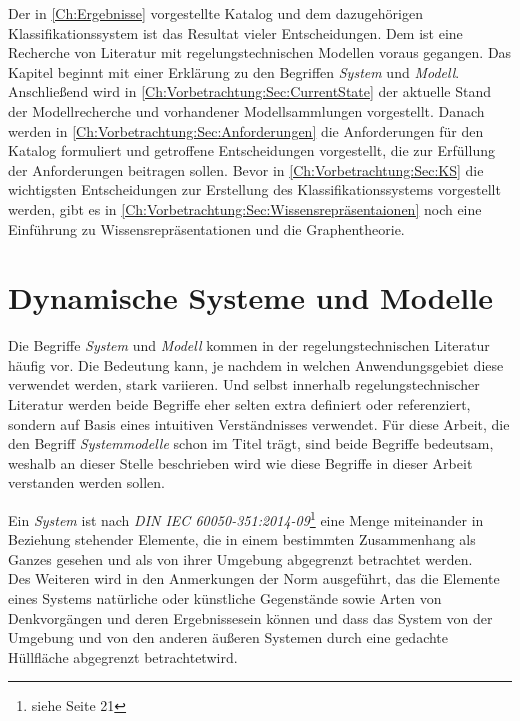 Der in \ref{Ch:Ergebnisse} vorgestellte Katalog und dem dazugehörigen Klassifikationssystem ist das Resultat vieler Entscheidungen. Dem ist eine Recherche von Literatur mit regelungstechnischen Modellen voraus gegangen. Das Kapitel beginnt mit einer Erklärung zu den Begriffen \textit{System} und \textit{Modell}. Anschließend wird in \ref{Ch:Vorbetrachtung:Sec:CurrentState} der aktuelle Stand der Modellrecherche und vorhandener Modellsammlungen vorgestellt. Danach werden in \ref{Ch:Vorbetrachtung:Sec:Anforderungen} die Anforderungen für den Katalog formuliert und getroffene Entscheidungen vorgestellt, die zur Erfüllung der Anforderungen beitragen sollen. Bevor in \ref{Ch:Vorbetrachtung:Sec:KS} die wichtigsten Entscheidungen zur Erstellung des Klassifikationssystems vorgestellt werden, gibt es in \ref{Ch:Vorbetrachtung:Sec:Wissensrepräsentaionen} noch eine Einführung zu Wissensrepräsentationen und die Graphentheorie.   

\section{Dynamische Systeme und Modelle}
\label{Ch:Vorbetrachtung:Sec:SystemeModelle}
Die Begriffe \textit{System} und \textit{Modell} kommen in der regelungstechnischen Literatur häufig vor. Die Bedeutung kann, je nachdem in welchen Anwendungsgebiet diese verwendet werden, stark variieren. Und selbst innerhalb regelungstechnischer Literatur werden beide Begriffe eher selten extra definiert oder referenziert, sondern auf Basis eines intuitiven Verständnisses verwendet. Für diese Arbeit, die den Begriff \textit{Systemmodelle} schon im Titel trägt, sind beide Begriffe bedeutsam, weshalb an dieser Stelle beschrieben wird wie diese Begriffe in dieser Arbeit verstanden werden sollen.

Ein \textit{System} ist nach \textit{DIN IEC 60050-351:2014-09}\footnote{siehe \cite{DINIEC60050-351} Seite 21} eine \glqq Menge miteinander in Beziehung stehender Elemente, die in einem bestimmten Zusammenhang als Ganzes gesehen und als von ihrer Umgebung abgegrenzt betrachtet werden\grqq.\\
Des Weiteren wird in den Anmerkungen der Norm ausgeführt, das die Elemente eines Systems \glqq natürliche oder künstliche Gegenstände sowie Arten von Denkvorgängen und deren Ergebnisse\grqq sein können und dass das System \glqq von der Umgebung und von den anderen äußeren Systemen durch eine gedachte Hüllfläche abgegrenzt betrachtet\grqq wird.

